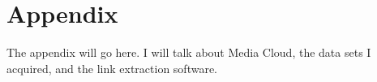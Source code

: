 \chapter{Appendix}

The appendix will go here. I will talk about Media Cloud, the data sets I acquired, and the link extraction software.

\clearpage
\newpage
